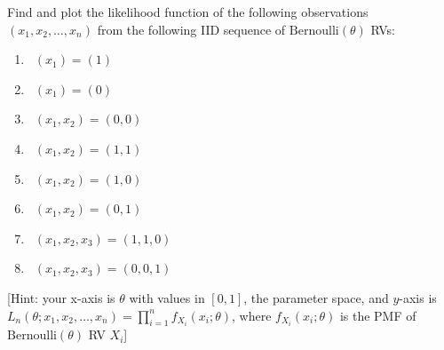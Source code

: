 \begin{Exercise}[title={Likelihoods of tiny $\bernoulli$ trials},label={ExLklOfTinyBernoulliTrials}]
Find and plot the likelihood function of the following observations $(x_1,x_2,\ldots,x_n)$ from the following IID sequence of $\mathrm{Bernoulli}(\theta)$ RVs:
\begin{enumerate}
\item~$(x_1)=(1)$
\item~$(x_1)=(0)$
\item~$(x_1,x_2)=(0,0)$
\item~$(x_1,x_2)=(1,1)$
\item~$(x_1,x_2)=(1,0)$
\item~$(x_1,x_2)=(0,1)$
\item~$(x_1,x_2,x_3)=(1,1,0)$
\item~$(x_1,x_2,x_3)=(0,0,1)$
\end{enumerate}
[Hint: your x-axis is $\theta$ with values in $[0,1]$, the parameter space, and $y$-axis is $L_n(\theta; x_1,x_2,\ldots,x_n) = \prod_{i=1}^n f_{X_i}(x_i;\theta)$, where $f_{X_i}(x_i;\theta)$ is the PMF of $\mathrm{Bernoulli}(\theta)$ RV $X_i$]
\end{Exercise}

